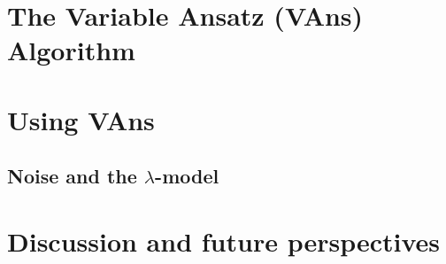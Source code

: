 
\section{The Variable Ansatz (VAns) Algorithm}\label{sec:vans_vans}

\section{Using VAns}\label{ssec:vans_results}


\subsection{Noise and the $\lambda$-model}\label{ssec:vans_results_noise}

\section{Discussion and future perspectives}\label{ssec:vans_discu}

